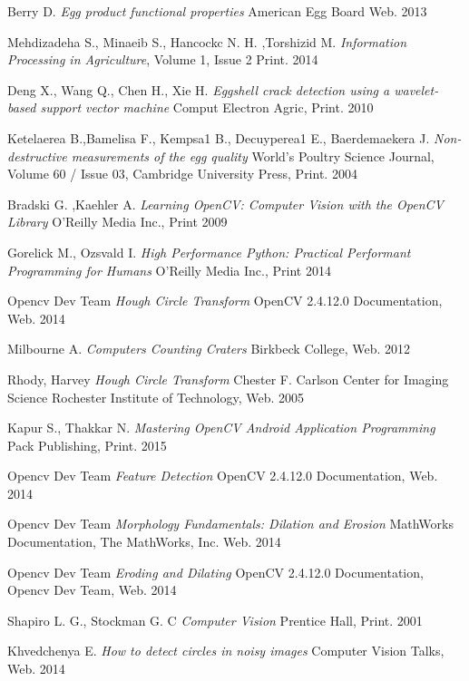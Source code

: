 \documentclass[12pt,twoside,a4paper]{article}
\begin{document}
\begin{thebibliography}{9}
 
Berry D.
\textit{Egg product functional properties} 
American Egg Board Web. 2013

Mehdizadeha S., Minaeib S., Hancockc N. H. ,Torshizid M.
\textit{Information Processing in Agriculture}, Volume 1, Issue 2 
Print. 2014

Deng X., Wang Q., Chen H., Xie H.
\textit{Eggshell crack detection using a wavelet-based support vector machine} Comput Electron Agric, Print. 2010

Ketelaerea B.,Bamelisa F., Kempsa1 B., Decuyperea1 E., Baerdemaekera J.
\textit{Non-destructive measurements of the egg quality} World's Poultry Science Journal, Volume 60 / Issue 03,  Cambridge University Press, Print. 2004
 
Bradski G. ,Kaehler A.
\textit{Learning OpenCV: Computer Vision with the OpenCV Library} O'Reilly Media Inc., Print 2009


Gorelick M., Ozsvald I.
\textit{High Performance Python: Practical Performant Programming for Humans} O'Reilly Media Inc., Print 2014

Opencv Dev Team
\textit{Hough Circle Transform} OpenCV 2.4.12.0 Documentation, Web. 2014

Milbourne A.
\textit{Computers Counting Craters} Birkbeck College, Web. 2012

Rhody, Harvey
\textit{Hough Circle Transform} Chester F. Carlson Center for Imaging Science Rochester Institute of Technology, Web. 2005

Kapur S., Thakkar N.
\textit{Mastering OpenCV Android Application Programming} Pack Publishing, Print. 2015

Opencv Dev Team
\textit{Feature Detection} OpenCV 2.4.12.0 Documentation, Web. 2014

Opencv Dev Team
\textit{Morphology Fundamentals: Dilation and Erosion} MathWorks Documentation, The MathWorks, Inc. Web. 2014

Opencv Dev Team
\textit{Eroding and Dilating} OpenCV 2.4.12.0 Documentation, Opencv Dev Team, Web. 2014

Shapiro L. G., Stockman G. C
\textit{Computer Vision} Prentice Hall, Print. 2001

Khvedchenya E.
\textit{How to detect circles in noisy images} Computer Vision Talks, Web. 2014


\end{thebibliography}
\end{document}

